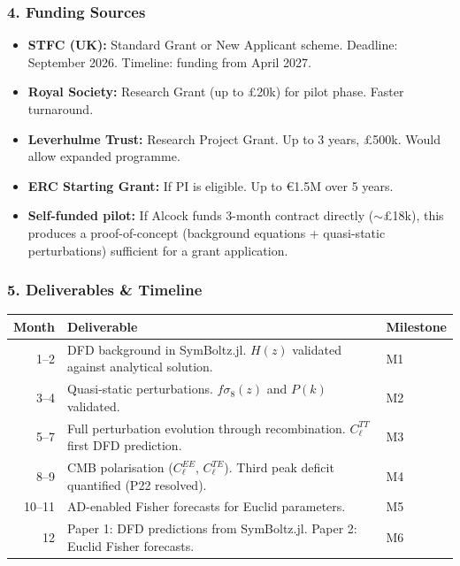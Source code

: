 \documentclass[11pt,a4paper]{article}
\begin{document}
\subsubsection{4. Funding Sources}

\begin{itemize}
\item \textbf{STFC (UK):} Standard Grant or New Applicant scheme. Deadline: September 2026. Timeline: funding from April 2027.
\item \textbf{Royal Society:} Research Grant (up to \pounds 20k) for pilot phase. Faster turnaround.
\item \textbf{Leverhulme Trust:} Research Project Grant. Up to 3 years, \pounds 500k. Would allow expanded programme.
\item \textbf{ERC Starting Grant:} If PI is eligible. Up to \euro 1.5M over 5 years.
\item \textbf{Self-funded pilot:} If Alcock funds 3-month contract directly ($\sim$\pounds 18k), this produces a proof-of-concept (background equations + quasi-static perturbations) sufficient for a grant application.
\end{itemize}

\subsubsection{5. Deliverables \& Timeline}

\begin{center}
\begin{longtable}{rp{7cm}l}
\toprule
\textbf{Month} & \textbf{Deliverable} & \textbf{Milestone} \\
\midrule
\endfirsthead
1--2 & DFD background in SymBoltz.jl. $H(z)$ validated against analytical solution. & M1 \\
3--4 & Quasi-static perturbations. $f\sigma_8(z)$ and $P(k)$ validated. & M2 \\
5--7 & Full perturbation evolution through recombination. $C_\ell^{TT}$ first DFD prediction. & M3 \\
8--9 & CMB polarisation ($C_\ell^{EE}$, $C_\ell^{TE}$). Third peak deficit quantified (P22 resolved). & M4 \\
10--11 & AD-enabled Fisher forecasts for Euclid parameters. & M5 \\
12 & Paper 1: DFD predictions from SymBoltz.jl. Paper 2: Euclid Fisher forecasts. & M6 \\
\bottomrule
\end{longtable}
\end{center}
\end{document}
